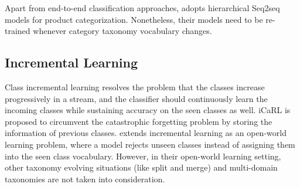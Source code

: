 Apart from end-to-end classification approaches, \cite{hasson2021category, li2018don} adopts hierarchical 
Seq2seq
models for product categorization. Nonetheless, their models need to be re-trained whenever category taxonomy vocabulary changes.

\subsection{Incremental Learning}
Class incremental learning resolves the problem that the classes increase progressively in a stream, and the classifier should continuously learn the incoming classes while sustaining accuracy on the seen classes as well. iCaRL \cite{rebuffi2017icarl} is proposed to 
circumvent the catastrophic forgetting problem by storing the information of previous classes. 
\cite{xu2019open} extends incremental learning as an open-world learning problem, where a model rejects unseen classes instead of assigning them into the seen class vocabulary. 
However, in their open-world learning setting, other taxonomy evolving situations (like split and merge) and multi-domain taxonomies are not taken into consideration.